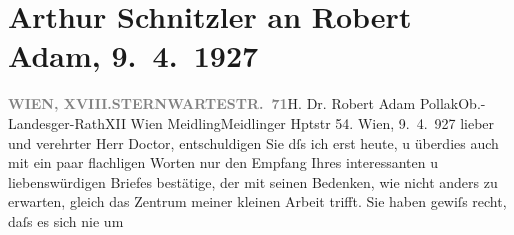 

         
         \renewcommand{\erwaehntePersonen}{Personen: Robert Adam}
         \renewcommand{\erwaehnteOrte}{Orte: Meidlinger Hauptstraße, Sternwartestraße, Wien, XII., Meidling, XVIII., Währing}
         \renewcommand{\erwaehnteWerke}{Werke: Der Geist im Wort und der Geist in der Tat}
               \section[Arthur Schnitzler an Robert Adam, 9. 4. 1927]{ Arthur Schnitzler an Robert Adam, 9. 4. 1927}\nopagebreak{}\rehead{ }\begin{ledgroupsized}[t]{13cm}\normalsize\beginnumbering{} \toendnotes[C]{\smallbreak\pagebreak[2]} 
\toendnotes[C]{\smallbreak}\pstart{}{\pb}\label{T_L02484-1v}\label{T_L02484-1h}\pend{}\pstart{}\textcolor{gray}{\textbf{WIEN, XVIII.}}\pend{}\pstart{}\textcolor{gray}{\textbf{STERNWARTESTR. 71}}\pend{}{\bigskip}\pstart{}H. Dr. Robert Adam Pollak\pend{}\pstart{}Ob.-Landesger-Rath\pend{}\pstart{}XII Wien Meidling\pend{}\pstart{}Meidlinger Hptstr 54.\pend{}{\bigskip}\pstart
           \raggedleft{}{\pb}Wien, 9. 4. 927\pend
           \pstart
           lieber und verehrter Herr Doctor, entschuldigen Sie dſs ich erst
               heute, u überdies auch mit ein paar flachligen Worten nur den Empfang Ihres
               interessanten u liebenswürdigen Briefes bestätige, der mit seinen Bedenken, wie nicht
               anders zu erwarten, gleich das Zentrum meiner kleinen Arbeit trifft. Sie haben gewiſs recht, daſs es sich nie um

\end{ledgroupsized}
